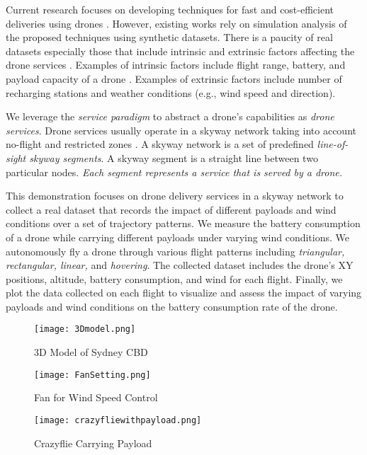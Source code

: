 \documentclass[runningheads]{llncs}
\begin{document}
Current research focuses on developing techniques for fast and cost-efficient deliveries using drones \cite{10.1007/978-3-030-33702-5_28}. However, existing works rely on simulation analysis of the proposed techniques using synthetic datasets. There is a paucity of real datasets especially those that include intrinsic and extrinsic factors affecting the drone services \cite{alkouz2020swarm}. Examples of intrinsic factors include flight range, battery, and payload capacity of a drone \cite{DBLP:journals/corr/abs-2107-05173}. Examples of extrinsic factors include number of recharging stations and weather conditions (e.g., wind speed and direction).

We leverage the \textit{service paradigm} to abstract a drone's capabilities as \textit{drone services}. Drone services usually operate in a skyway network taking into account no-flight and restricted zones \cite{SHAHZAAD2021335}. A skyway network is a set of predefined \textit{line-of-sight skyway segments}. A skyway segment is a straight line between two particular nodes. \textit{Each segment represents a service that is served by a drone.}

This demonstration focuses on drone delivery services in a skyway network to collect a real dataset that records the impact of different payloads and wind conditions over a set of trajectory patterns. We measure the battery consumption of a drone while carrying different payloads under varying wind conditions. We autonomously fly a drone through various flight patterns including \textit{triangular, rectangular, linear,} and \textit{hovering}. The collected dataset includes the drone’s XY positions, altitude, battery consumption, and wind for each flight. Finally, we plot the data collected on each flight to visualize and assess the impact of varying payloads and wind conditions on the battery consumption rate of the drone.

\begin{figure*}[t]
\centering
  \texttt{[image: 3Dmodel.png]}
   \caption{3D Model of Sydney CBD}\label{3d}
\endminipage\hfill
{}%
\centering
  \texttt{[image: FanSetting.png]}
   \caption{Fan for Wind Speed Control}\label{fan}
\endminipage\hfill
{}
  \texttt{[image: crazyfliewithpayload.png]}
  \caption{Crazyflie Carrying Payload}\label{payload}
\endminipage
\vspace{-0.6 cm}
\end{figure*}
\vspace{-0.4 cm}
\end{document}
